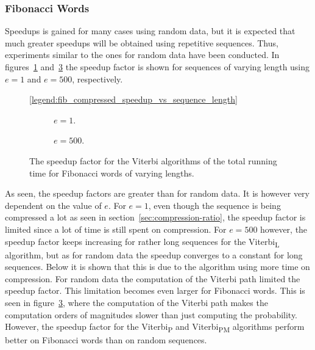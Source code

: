 \subsubsection{Fibonacci Words}

Speedups is gained for many cases using random data, but it is
expected that much greater speedups will be obtained using repetitive
sequences. Thus, experiments similar to the ones for random data have been
conducted. In figures~\ref{fig:fib_compressed_1_speedup_vs_sequence_length}
and~\ref{fig:fib_compressed_500_speedup_vs_sequence_length} the speedup factor
is shown for sequences of varying length using $e = 1$ and $e = 500$,
respectively.

\begin{figure}[htbp]
  \centering\ref{legend:fib_compressed_speedup_vs_sequence_length}\\
  \begin{subfigure}[b]{0.5\textwidth}
    \centering 
    \caption{$e = 1$.}
    \label{fig:fib_compressed_1_speedup_vs_sequence_length}
  \end{subfigure}\hspace{-5mm}%
  \begin{subfigure}[b]{0.5\textwidth}
    \centering
    
    \caption{$e = 500$.}
    \label{fig:fib_compressed_500_speedup_vs_sequence_length}
  \end{subfigure}
  \caption{The speedup factor for the Viterbi algorithms of
      the total running time for Fibonacci words of varying lengths.}
\end{figure}

As seen, the speedup factors are greater than for random data. It is however
very dependent on the value of $e$. For $e = 1$, even though the sequence is
being compressed a lot as seen in section~\ref{sec:compression-ratio}, the
speedup factor is limited since a lot of time is still spent on compression.
For $e = 500$ however, the speedup factor keeps increasing for rather long
sequences for the Viterbi\textsubscript{L} algorithm, but as for random data
the speedup converges to a constant for long sequences. Below it is shown that
this is due to the algorithm using more time on compression. For random data
the computation of the Viterbi path limited the speedup factor. This limitation
becomes even larger for Fibonacci words. This is seen in
figure~\ref{fig:fib_compressed_500_speedup_vs_sequence_length}, where the
computation of the Viterbi path makes the computation orders of magnitudes
slower than just computing the probability. However, the speedup factor for the
Viterbi\textsubscript{P} and Viterbi\textsubscript{PM} algorithms perform
better on Fibonacci words than on random sequences.

